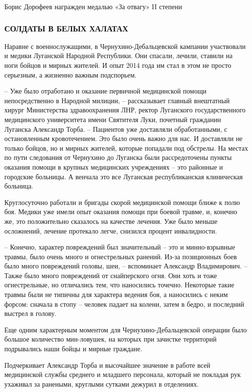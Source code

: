 Борис Дорофеев награжден медалью «За отвагу» II степени

\subsubsection{СОЛДАТЫ В БЕЛЫХ ХАЛАТАХ}

Наравне с военнослужащими, в Чернухино-Дебальцевской кампании участвовали и
медики Луганской Народной Республики. Они спасали, лечили, ставили на ноги
бойцов и мирных жителей. И опыт 2014 года им стал в этом не просто серьезным, а
жизненно важным подспорьем.

– Уже было отработано и оказание первичной медицинской помощи непосредственно в
Народной милиции, – рассказывает главный внештатный хирург Министерства
здравоохранения ЛНР, ректор Луганского государственного медицинского
университета имени Святителя Луки, почетный гражданин Луганска Александр Торба.
– Пациентов уже доставляли обработанными, с остановленным кровотечением. Это
было очень важно для нас. И доставляли не только бойцов, но и мирных жителей,
которые попадали под обстрелы. На местах по пути следования от Чернухино до
Луганска были рассредоточены пункты оказания помощи в крупных медицинских
учреждениях – это районные и городские больницы. А венчала это все Луганская
республиканская клиническая больница. 

Круглосуточно работали и бригады скорой медицинской помощи ближе к полю боя.
Медики уже имели опыт оказания помощи при боевой травме, и, конечно же, это
положительно сказалось на качестве лечения. Уже было меньше осложнений, лечение
протекало легче, снизился процент инвалидности. 

– Конечно, характер повреждений был значительный – это и минно-взрывные травмы,
было очень много и огнестрельных ранений. Из-за позиционных боев было много
повреждений головы, шеи, – вспоминает Александр Владимирович. – Также было
много повреждений от снайперского огня. Они хоть и тоже огнестрельные, но
отличались тем, что наносились точечно. Некоторые такие травмы были не типичны
для характера ведения боя, а наносились с неким форсом: сначала в стопу –
человек падает на колени, затем в бедро, и последний выстрел в голову.

Еще одним характерным моментом для Чернухино-Дебальцевской операции было
большое количество мин-ловушек, на которых при зачистке территорий подрывались
наши бойцы и мирные граждане. 

Подчеркивает Александр Торба и высочайшее значение в работе всей медицинской
службы среднего и младшего персонала, который не покладая рук ухаживал за
ранеными, круглыми сутками дежурил в отделениях.

